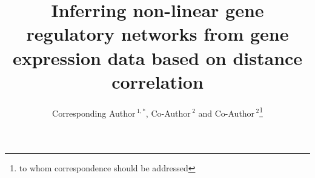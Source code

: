 \documentclass{bioinfo}
\begin{document}

\title[short Title]{Inferring non-linear gene regulatory networks from gene expression data based on distance correlation}
\author[Sample \textit{et~al}]{Corresponding Author\,$^{1,*}$, Co-Author\,$^{2}$ and Co-Author\,$^2$\footnote{to whom correspondence should be addressed}}
\address{$^{1}$Department of XXXXXXX, Address XXXX etc.\\
$^{2}$Department of XXXXXXXX, Address XXXX etc.}



\maketitle
\end{document}
